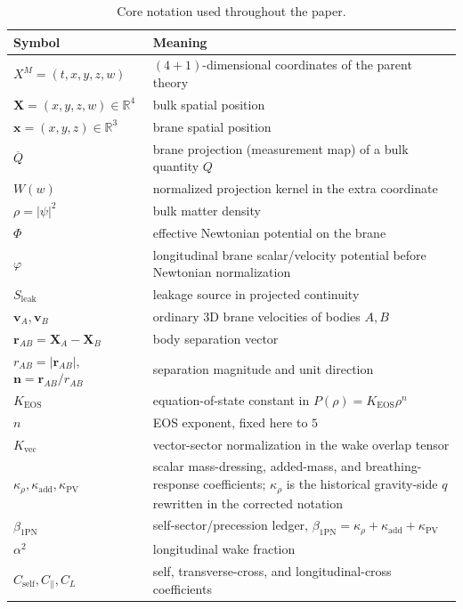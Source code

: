 \documentclass[11pt]{article}
\newcommand{\R}{\mathbb R}
\newcommand{\X}{\mathbf X}
\newcommand{\x}{\mathbf x}
\newcommand{\vct}{\mathbf v}
\newcommand{\nvec}{\mathbf n}
\newcommand{\Wproj}{W}
\newcommand{\Proj}[1]{\overline{#1}}
\newcommand{\kadd}{\kappa_{\mathrm{add}}}
\newcommand{\kPV}{\kappa_{\mathrm{PV}}}
\newcommand{\krho}{\kappa_{\rho}}
\newcommand{\betaPN}{\beta_{\mathrm{1PN}}}
\newcommand{\Kvec}{K_{\mathrm{vec}}}
\newcommand{\KEOS}{K_{\mathrm{EOS}}}
\newcommand{\alphaSq}{\alpha^2}
\newcommand{\PhiN}{\Phi}
\newcommand{\phibr}{\varphi}
\newcommand{\Sleak}{S_{\mathrm{leak}}}
\newcommand{\Cself}{C_{\mathrm{self}}}
\newcommand{\Cpara}{C_{\parallel}}
\newcommand{\CLong}{C_{L}}
\begin{document}
\begin{table}[t]
  \centering
  \caption{Core notation used throughout the paper.}
  \label{tab:notation-core}
  \small
  \renewcommand{\arraystretch}{1.15}
  \begin{tabularx}{\linewidth}{@{}L L@{}}
    \toprule
    Symbol & Meaning \\
    \midrule
    \(X^M=(t,x,y,z,w)\) & \((4+1)\)-dimensional coordinates of the parent theory \\
    \(\X=(x,y,z,w)\in\R^4\) & bulk spatial position \\
    \(\x=(x,y,z)\in\R^3\) & brane spatial position \\
    \(\Proj{Q}\) & brane projection (measurement map) of a bulk quantity \(Q\) \\
    \(\Wproj(w)\) & normalized projection kernel in the extra coordinate \\
    \(\rho=|\psi|^2\) & bulk matter density \\
    \(\PhiN\) & effective Newtonian potential on the brane \\
    \(\phibr\) & longitudinal brane scalar/velocity potential before Newtonian normalization \\
    \(\Sleak\) & leakage source in projected continuity \\
    \(\vct_A,\vct_B\) & ordinary 3D brane velocities of bodies \(A,B\) \\
    \(\mathbf r_{AB}=\mathbf X_A-\mathbf X_B\) & body separation vector \\
    \(r_{AB}=|\mathbf r_{AB}|\), \(\nvec=\mathbf r_{AB}/r_{AB}\) & separation magnitude and unit direction \\
    \(\KEOS\) & equation-of-state constant in \(P(\rho)=\KEOS\rho^n\) \\
    \(n\) & EOS exponent, fixed here to \(5\) \\
    \(\Kvec\) & vector-sector normalization in the wake overlap tensor \\
    \(\krho,\kadd,\kPV\) & scalar mass-dressing, added-mass, and breathing-response coefficients; \(\krho\) is the historical gravity-side \(q\) rewritten in the corrected notation \\
    \(\betaPN\) & self-sector/precession ledger, \(\betaPN=\krho+\kadd+\kPV\) \\
    \(\alphaSq\) & longitudinal wake fraction \\
    \(\Cself,\Cpara,\CLong\) & self, transverse-cross, and longitudinal-cross coefficients \\
    \bottomrule
  \end{tabularx}
\end{table}
\end{document}
